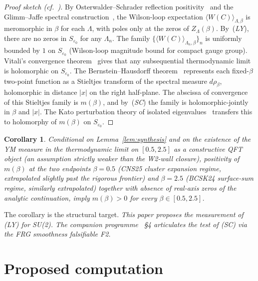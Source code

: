 \documentclass[11pt,a4paper]{article}
\newtheorem{corollary}[theorem]{Corollary}
\theoremstyle{definition}
\theoremstyle{remark}
\begin{document}
\begin{proof}[Proof sketch (cf.~\cite{W2analyticite2026})]
By Osterwalder--Schrader reflection
positivity~\cite{OsterwalderSchrader1973} and the Glimm--Jaffe
spectral construction~\cite[\S19]{GlimmJaffe1981}, the Wilson-loop
expectation $\langle W(C) \rangle_{\Lambda, \beta}$ is meromorphic
in $\beta$ for each $\Lambda$, with poles only at the zeros of
$Z_\Lambda(\beta)$. By~(\emph{LY}), there are no zeros in
$S_{\varepsilon_0}$ for any $\Lambda_n$. The family
$\{\langle W(C) \rangle_{\Lambda_n, \beta}\}_n$ is uniformly
bounded by $1$ on $S_{\varepsilon_0}$ (Wilson-loop magnitude
bound for compact gauge group). Vitali's convergence
theorem~\cite[Thm.~14.6]{Hille1962} gives that any subsequential
thermodynamic limit is holomorphic on $S_{\varepsilon_0}$. The
Bernstein--Hausdorff theorem~\cite{Bernstein1928} represents
each fixed-$\beta$ two-point function as a Stieltjes transform of
the spectral measure $d\rho_\beta$, holomorphic in distance $|x|$
on the right half-plane. The abscissa of convergence of this
Stieltjes family is $m(\beta)$, and by~(\emph{SC}) the family is
holomorphic-jointly in $\beta$ and $|x|$. The Kato perturbation
theory of isolated eigenvalues~\cite[Thm.~VII.1.7]{Kato1995}
transfers this to holomorphy of $m(\beta)$ on $S_{\varepsilon_0}$.
\end{proof}

\begin{corollary}\label{cor:posgap}
Conditional on Lemma~\ref{lem:synthesis} and on the existence of
the YM measure in the thermodynamic limit on $[0.5, 2.5]$ as a
constructive QFT object (an assumption strictly weaker than the
W2-wall closure), positivity of $m(\beta)$ at the two endpoints
$\beta = 0.5$ (CNS25 cluster expansion regime, extrapolated
slightly past the rigorous frontier) and $\beta = 2.5$ (BCSK24
surface-sum regime, similarly extrapolated) together with
absence of real-axis zeros of the analytic continuation, imply
$m(\beta) > 0$ for every $\beta \in [0.5, 2.5]$.
\end{corollary}

The corollary is the structural target. \emph{This paper proposes
the measurement of (LY) for SU(2). The companion programme
\cite{W2analyticite2026}~\S4 articulates the test of (SC) via the
FRG smoothness falsifiable F2.}

\medskip

\section{Proposed computation}\label{sec:protocol}
\end{document}
